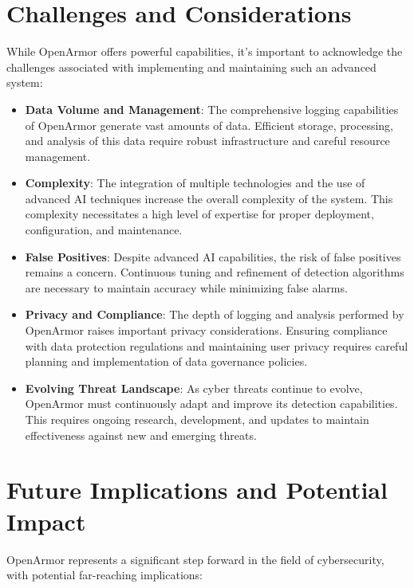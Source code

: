 \section{Challenges and Considerations}

While OpenArmor offers powerful capabilities, it's important to acknowledge the challenges associated with implementing and maintaining such an advanced system:

\begin{itemize}
    \item \textbf{Data Volume and Management}: The comprehensive logging capabilities of OpenArmor generate vast amounts of data. Efficient storage, processing, and analysis of this data require robust infrastructure and careful resource management.
    
    \item \textbf{Complexity}: The integration of multiple technologies and the use of advanced AI techniques increase the overall complexity of the system. This complexity necessitates a high level of expertise for proper deployment, configuration, and maintenance.
    
    \item \textbf{False Positives}: Despite advanced AI capabilities, the risk of false positives remains a concern. Continuous tuning and refinement of detection algorithms are necessary to maintain accuracy while minimizing false alarms.
    
    \item \textbf{Privacy and Compliance}: The depth of logging and analysis performed by OpenArmor raises important privacy considerations. Ensuring compliance with data protection regulations and maintaining user privacy requires careful planning and implementation of data governance policies.
    
    \item \textbf{Evolving Threat Landscape}: As cyber threats continue to evolve, OpenArmor must continuously adapt and improve its detection capabilities. This requires ongoing research, development, and updates to maintain effectiveness against new and emerging threats.
\end{itemize}

\section{Future Implications and Potential Impact}

OpenArmor represents a significant step forward in the field of cybersecurity, with potential far-reaching implications:

